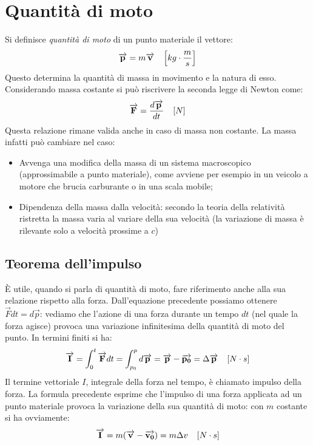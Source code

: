 \documentclass[class=book, crop=false, oneside, 12pt]{standalone}
\begin{document}
\section{Quantità di moto}
Si definisce \emph{quantità di moto} di un punto materiale il vettore:
\begin{equation}
    \overrightarrow{p} = m \overrightarrow{v} \ \udm{kg \cdot \frac{m}{s}}
\end{equation}
Questo determina la quantit\`a di massa in movimento e la natura di esso.
Considerando massa costante si pu\`o riscrivere la seconda legge di Newton come:
\begin{equation}
    \overrightarrow{F} = \frac{d \overrightarrow{p}}{dt} \ \udm{N}
\end{equation}
Questa relazione rimane valida anche in caso di massa non costante.
La massa infatti può cambiare nel caso:
\begin{itemize}
    \item Avvenga una modifica della massa di un sistema macroscopico (approssimabile a punto materiale), come avviene per esempio in un veicolo a motore che brucia carburante o in una scala mobile;
    \item Dipendenza della massa dalla velocità: secondo la teoria della relatività ristretta la massa varia al variare della sua velocità (la variazione di massa è rilevante solo a velocità prossime a \(c\))
\end{itemize}
\subsection{Teorema dell'impulso}
È utile, quando si parla di quantità di moto, fare riferimento anche alla sua relazione rispetto alla forza.
Dall'equazione precedente possiamo ottenere \(\overrightarrow{F} d t = d \overrightarrow{p}\): vediamo che l'azione di una forza durante un tempo \(d t\) (nel quale la forza agisce) provoca una variazione infinitesima della quantità di moto del punto.
In termini finiti si ha:
\begin{equation}
    \overrightarrow{I} = \int_0^t \overrightarrow{F} dt = \int_{p_0}^p d \overrightarrow{p} = \overrightarrow{p}-\overrightarrow{p_0} = \Delta \overrightarrow{p} \ \udm{N \cdot s}
\end{equation}
Il termine vettoriale \(I\), integrale della forza nel tempo, è chiamato impulso della forza.
La formula precedente esprime che l'impulso di una forza applicata ad un punto materiale provoca la variazione della sua quantità di moto: con \(m\) costante si ha ovviamente:
\begin{equation}
    \overrightarrow{I} = m (\overrightarrow{v} - \overrightarrow{v_0}) = m \Delta v \ \udm{N \cdot s}
\end{equation}
\end{document}
